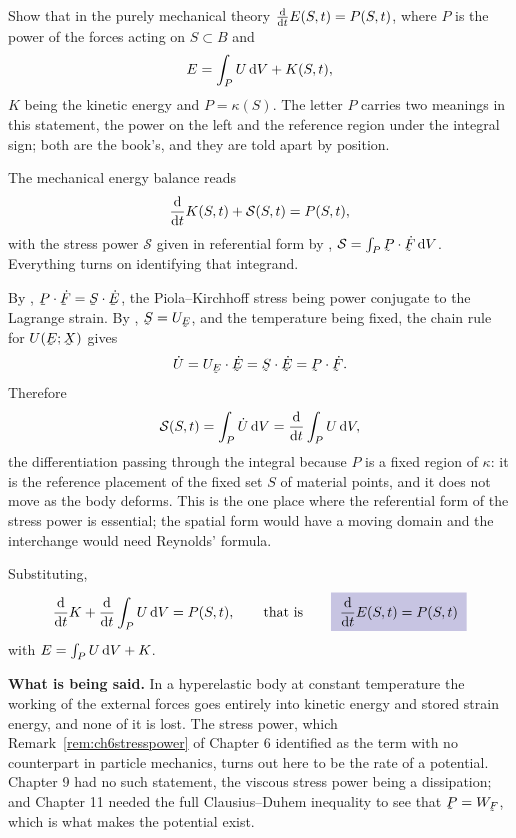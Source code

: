 \begin{problem}
Show that in the purely mechanical theory
$\tfrac{\mathrm{d}}{\mathrm{d} t}E(S,t)=P(S,t)$, where $P$ is the power of the forces
acting on $S\subset B$ and
\[
   E=\int_{P}U\,\mathrm{d} V+K(S,t),
\]
$K$ being the kinetic energy and $P=\kappa(S)$. The letter $P$ carries
two meanings in this statement, the power on the left and the reference
region under the integral sign; both are the book's, and they are told
apart by position.
\end{problem}

\begin{solution}
The mechanical energy balance  reads
\[
   \frac{\mathrm{d}}{\mathrm{d} t}K(S,t)+\mathcal{S}(S,t)=P(S,t),
\]
with the stress power $\mathcal{S}$ given in referential form by
, $\mathcal{S}=\int_{P}\bP\cdot\dot\bF\,\dl V$. Everything
turns on identifying that integrand.

By , $\bP\cdot\dot\bF=\bS\cdot\dot\bE$, the
Piola--Kirchhoff stress being power conjugate to the Lagrange strain.
By , $\bS=U_{\bE}$, and the temperature being fixed, the
chain rule for $U(\bE;\bX)$ gives
\[
   \dot U=U_{\bE}\cdot\dot\bE=\bS\cdot\dot\bE=\bP\cdot\dot\bF .
\]
Therefore
\[
   \mathcal{S}(S,t)=\int_{P}\dot U\,\mathrm{d} V
   =\frac{\mathrm{d}}{\mathrm{d} t}\int_{P}U\,\mathrm{d} V ,
\]
the differentiation passing through the integral because $P$ is a fixed
region of $\kappa$: it is the reference placement of the fixed set $S$
of material points, and it does not move as the body deforms. This is
the one place where the referential form of the stress power is
essential; the spatial form would have a moving domain and the
interchange would need Reynolds' formula.

Substituting,
\[
   \frac{\dl}{\dl t}K+\frac{\dl}{\dl t}\int_{P}U\,\dl V=P(S,t),
   \qquad\text{that is}\qquad
   \boxed{\;\frac{\dl}{\dl t}E(S,t)=P(S,t)\;}
\]
with $E=\int_{P}U\,\mathrm{d} V+K$.

\textbf{What is being said.} In a hyperelastic body at constant
temperature the working of the external forces goes entirely into
kinetic energy and stored strain energy, and none of it is lost. The
stress power, which Remark~\ref{rem:ch6stresspower} of Chapter 6
identified as the term with no counterpart in particle mechanics,
turns out here to be the rate of a potential. Chapter 9 had no such
statement, the viscous stress power being a dissipation; and
Chapter 11 needed the full Clausius--Duhem inequality to see that
$\bP=W_{\bF}$, which is what makes the potential exist.
\end{solution}

